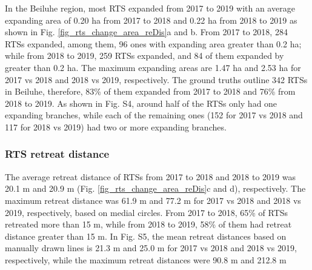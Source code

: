 \documentclass[authoryear,preprint,review,12pt]{elsarticle}
\begin{document}

In the Beiluhe region, most RTS expanded from 2017 to 2019 with an average expanding area of 0.20 ha from 2017 to 2018 and 0.22 ha from 2018 to 2019 as shown in Fig. \ref{fig_rts_change_area_reDis}a and b.
From 2017 to 2018, 284 RTSs expanded, among them, 96 ones with expanding area greater than 0.2 ha; while from 2018 to 2019, 259 RTSs expanded, and 84 of them expanded by greater than 0.2 ha.
The maximum expanding areas are 1.47 ha and 2.53 ha for 2017 vs 2018 and 2018 vs 2019, respectively. 
The ground truths outline 342 RTSs in Beiluhe, therefore, 83\% of them expanded from 2017 to 2018 and 76\% from 2018 to 2019. 
As shown in Fig. S4, around half of the RTSs only had one expanding branches, while each of the remaining ones (152 for 2017 vs 2018 and 117 for 2018 vs 2019)  had two or more expanding branches. 



\subsubsection{RTS retreat distance}
\label{sec_rts_retreat_distance}

The average retreat distance of RTSs from 2017 to 2018 and 2018 to 2019 was 20.1 m and 20.9 m (Fig. \ref{fig_rts_change_area_reDis}c and d), respectively. 
The maximum retreat distance was 61.9 m and 77.2 m for 2017 vs 2018 and 2018 vs 2019, respectively, based on medial circles. 
From 2017 to 2018, 65\% of RTSs retreated more than 15 m, while from 2018 to 2019, 58\% of them had retreat distance greater than 15 m. 
In Fig. S5, the mean retreat distances based on manually drawn lines is 21.3 m and 25.0 m for 2017 vs 2018 and 2018 vs 2019, respectively, while the maximum retreat distances were 90.8 m and 212.8 m
\end{document}
